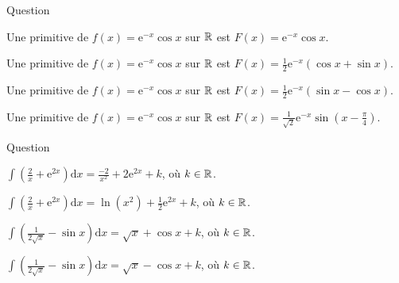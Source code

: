 \begin{multi}[multiple,feedback=
{\(\displaystyle \left[\frac{1}{2}\mathrm{e}^{-x}\left(\sin x-\cos x\right)\right]'=\mathrm{e}^{-x}\cos x\) et \(\displaystyle \left[\frac{1}{\sqrt{2}}\mathrm{e}^{-x}\sin \left(x-\frac{\pi}{4}\right)\right]'=\mathrm{e}^{-x}\cos x\). Donc \(\displaystyle \frac{1}{2}\mathrm{e}^{-x}\left(\sin x-\cos x\right)\) et \(\displaystyle \frac{1}{\sqrt{2}}\mathrm{e}^{-x}\sin \left(x-\frac{\pi}{4}\right)\) sont des primitives de \(\displaystyle \mathrm{e}^{-x}\cos x\) sur \(\Rr\).
}]{Question}
    \item Une primitive de \(\displaystyle f(x)=\mathrm{e}^{-x}\cos x\) sur \(\Rr\) est \(\displaystyle F(x)=\mathrm{e}^{-x}\cos x\).
    \item Une primitive de \(\displaystyle f(x)=\mathrm{e}^{-x}\cos x\) sur \(\Rr\) est \(\displaystyle F(x)=\frac{1}{2}\mathrm{e}^{-x}\left(\cos x+\sin x\right)\).
    \item* Une primitive de \(\displaystyle f(x)=\mathrm{e}^{-x}\cos x\) sur \(\Rr\) est \(\displaystyle F(x)=\frac{1}{2}\mathrm{e}^{-x}\left(\sin x-\cos x\right)\).
    \item* Une primitive de \(\displaystyle f(x)=\mathrm{e}^{-x}\cos x\) sur \(\Rr\) est \(\displaystyle F(x)=\frac{1}{\sqrt{2}}\mathrm{e}^{-x}\sin \left(x-\frac{\pi}{4}\right)\).
\end{multi}


\begin{multi}[multiple,feedback=
{On a : \(\displaystyle \int \frac{2\, \mathrm{d}x}{x}=\ln (x^2)+k\) et \(\displaystyle \int\mathrm{e}^{2x}\mathrm{d}x=\frac{1}{2}\mathrm{e}^{2x}+k\). D'où, par linéarité,
\[\int \left(\frac{2}{x}+\mathrm{e}^{2x}\right)\mathrm{d}x=\ln (x^2)+\frac{1}{2}\mathrm{e}^{2x}+k.\]
De même, on vérifie que : \(\displaystyle \int \left(\frac{1}{2\sqrt{x}}-\sin x\right)\mathrm{d}x=\sqrt{x}+\cos x+k\), où \(k\in \Rr\).
}]{Question}
    \item \(\displaystyle \int \left(\frac{2}{x}+\mathrm{e}^{2x}\right)\mathrm{d}x=\frac{-2}{x^2}+2\mathrm{e}^{2x}+k\), où \(k\in \Rr\).
    \item* \(\displaystyle \int \left(\frac{2}{x}+\mathrm{e}^{2x}\right)\mathrm{d}x=\ln (x^2)+\frac{1}{2}\mathrm{e}^{2x}+k\), où \(k\in \Rr\).
    \item* \(\displaystyle \int \left(\frac{1}{2\sqrt{x}}-\sin x\right)\mathrm{d}x=\sqrt{x}+\cos x+k\), où \(k\in \Rr\).
    \item \(\displaystyle \int \left(\frac{1}{2\sqrt{x}}-\sin x\right)\mathrm{d}x=\sqrt{x}-\cos x+k\), où \(k\in \Rr\).
\end{multi}


